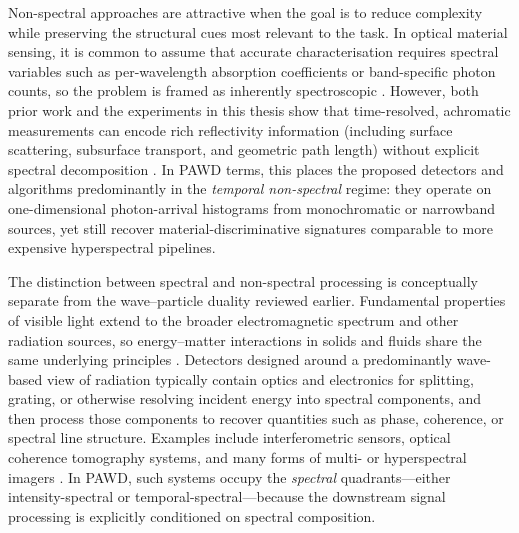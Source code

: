 \documentclass[12pt,a4paper,oneside]{report}
\begin{document}
Non-spectral approaches are attractive when the goal is to reduce complexity while preserving the structural cues most relevant to the task. In optical material sensing, it is common to assume that accurate characterisation requires spectral variables such as per-wavelength absorption coefficients or band-specific photon counts, so the problem is framed as inherently spectroscopic \cite{holt2016,baly1912}. However, both prior work and the experiments in this thesis show that time-resolved, achromatic measurements can encode rich reflectivity information (including surface scattering, subsurface transport, and geometric path length) without explicit spectral decomposition \cite{su2016,becker2023}. In PAWD terms, this places the proposed detectors and algorithms predominantly in the \emph{temporal non-spectral} regime: they operate on one-dimensional photon-arrival histograms from monochromatic or narrowband sources, yet still recover material-discriminative signatures comparable to more expensive hyperspectral pipelines.

The distinction between spectral and non-spectral processing is conceptually separate from the wave--particle duality reviewed earlier. Fundamental properties of visible light extend to the broader electromagnetic spectrum and other radiation sources, so energy--matter interactions in solids and fluids share the same underlying principles \cite{elachi2021,griffiths2017,charles1924}. Detectors designed around a predominantly wave-based view of radiation typically contain optics and electronics for splitting, grating, or otherwise resolving incident energy into spectral components, and then process those components to recover quantities such as phase, coherence, or spectral line structure. Examples include interferometric sensors, optical coherence tomography systems, and many forms of multi- or hyperspectral imagers \cite{huang1991,zeitler2007,vasile2023}. In PAWD, such systems occupy the \emph{spectral} quadrants—either intensity-spectral or temporal-spectral—because the downstream signal processing is explicitly conditioned on spectral composition.
\end{document}
